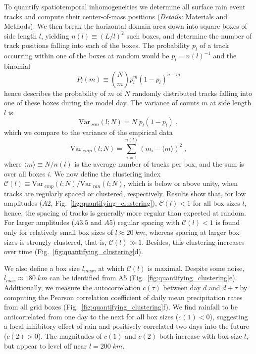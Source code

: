 \documentclass[draft,linenumbers]{agujournal2019}
\def\Var{{\textrm{Var}}\,}
\begin{document}
To quantify spatiotemporal inhomogeneities we determine all surface rain event tracks and compute their center-of-mass positions ({\it Details:} Materials and Methods).
We then break the horizontal domain area down into square boxes of side length $l$, yielding $n(l)\equiv (L/l)^2$ such boxes, and determine the number of track positions falling into each of the boxes.
The probability $p_l$ of a track occurring within one of the boxes at random would be $p_l=n(l)^{-1}$
and the binomial
\begin{equation}
    P_l(m)\equiv \binom{N}{m} p_l^m\left( 1-p_l \right)^{n-m}
    \label{eq:binomial}
\end{equation}
hence describes the probability of $m$ of $N$ randomly distributed tracks falling into one of these boxes during the model day.
The variance of counts $m$ at side length $l$ is \cite{feller1957introduction} 
\begin{equation}
    \Var_{ran}(l;N) = N\;p_l(1-p_l)\;,
    \label{eq:var_ran}
\end{equation}
which we compare to the variance of the empirical data 
\begin{equation}
    \Var_{emp}(l;N) = \sum_{i=1}^{n(l)}(m_i-\langle m\rangle)^2\;,
    \label{eq:var_emp}
\end{equation}
where $\langle m\rangle\equiv N/n(l)$ is the average number of tracks per box, and the sum is over all boxes $i$.
We now define the clustering index $\mathcal{C}(l)\equiv \Var_{emp}(l;N)/\Var_{ran}(l;N)$, which is below or above unity, when tracks are regularly spaced or clustered, respectively.
Results show that, for low amplitudes ($A2$, Fig.~\ref{fig:quantifying_clustering}), $\mathcal{C}(l)<1$ for all box sizes $l$, hence, the spacing of tracks is generally more regular than expected at random.
For larger amplitudes ($A3.5$ and $A5$) regular spacing \cite{tompkins2017organization} with $\mathcal{C}(l)<1$ is found only for relatively small box sizes of $l\approx 20\;km$, whereas spacing at larger box sizes is strongly clustered, that is, $\mathcal{C}(l)\gg 1$.
Besides, this clustering increases over time (Fig.~\ref{fig:quantifying_clustering}d).

We also define a box size $l_{max}$, at which $\mathcal{C}(l)$ is maximal.
Despite some noise, $l_{max}\approx 180\;km$ can be identified from A5 (Fig.~\ref{fig:quantifying_clustering}e).
Additionally, we measure the autocorrelation $c(\tau)$ between day $d$ and $d+\tau$ by computing the Pearson correlation coefficient of daily mean precipitation rates from all grid boxes (Fig.~\ref{fig:quantifying_clustering}f). 
We find rainfall to be anticorrelated from one day to the next for all box sizes   ($c(1)<0$), suggesting a local inhibitory effect of rain and positively correlated two days into the future ($c(2)>0$).
The magnitudes of $c(1)$ and $c(2)$ both increase with box size $l$, but appear to level off near $l=200\;km$.
\end{document}
